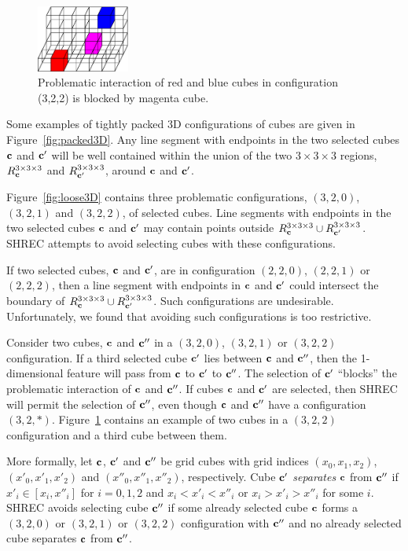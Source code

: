 \begin{figure}[t]
\centering

\includegraphics[width=1.2in]{images/config3D_3_2_2_B.eps}

\caption{Problematic interaction of red and blue cubes
in configuration (3,2,2) is blocked by magenta cube.}
\label{fig:blocked3D}
\end{figure}

Some examples of tightly packed 3D configurations of cubes are given
in Figure~\ref{fig:packed3D}.
Any line segment with endpoints in the two selected cubes $\mathbf{c}$ and $\mathbf{c}'$
will be well contained within the union 
of the two $3 \times 3 \times 3$ regions, 
$R^{3 \times 3 \times 3}_{\mathbf{c}}$ and $R^{3 \times 3 \times 3}_{\mathbf{c}'}$, around $\mathbf{c}$ and $\mathbf{c}'$.

Figure~\ref{fig:loose3D} contains three problematic configurations,
$(3,2,0)$, $(3,2,1)$ and $(3,2,2)$,
of  selected cubes.
Line segments with endpoints in the two selected cubes $\mathbf{c}$ and $\mathbf{c}'$
may contain points outside $R^{3 \times 3 \times 3}_{\mathbf{c}} \cup R^{3 \times 3 \times 3}_{\mathbf{c}'}$.
SHREC attempts to avoid selecting cubes with these configurations.

If two selected cubes, $\mathbf{c}$ and $\mathbf{c}'$, 
are in configuration $(2,2,0)$, $(2,2,1)$ or $(2,2,2)$,
then a line segment with endpoints in $\mathbf{c}$ and $\mathbf{c}'$
could intersect the boundary of $R^{3 \times 3 \times 3}_{\mathbf{c}} \cup R^{3 \times 3 \times 3}_{\mathbf{c}'}$.
Such configurations are undesirable.
Unfortunately, we found that avoiding such configurations is too restrictive.

Consider two cubes, $\mathbf{c}$ and $\mathbf{c}''$ 
in a $(3,2,0)$, $(3,2,1)$ or $(3,2,2)$ configuration.
If a third selected cube $\mathbf{c}'$ lies between $\mathbf{c}$ and $\mathbf{c}''$,
then the 1-dimensional feature will pass from $\mathbf{c}$ to $\mathbf{c}'$ to $\mathbf{c}''$.
The selection of $\mathbf{c}'$ ``blocks'' the problematic interaction 
of $\mathbf{c}$ and $\mathbf{c}''$.
If cubes $\mathbf{c}$ and $\mathbf{c}'$ are selected,
then SHREC will permit the selection of $\mathbf{c}''$,
even though $\mathbf{c}$ and $\mathbf{c}''$ have a configuration $(3,2,*)$.
Figure~\ref{fig:blocked3D} contains an example of two cubes 
in a $(3,2,2)$ configuration and a third cube between them.

More formally,
let $\mathbf{c}$, $\mathbf{c}'$ and $\mathbf{c}''$ be grid cubes with grid indices
$(x_0,x_1,x_2)$, $(x'_0,x'_1,x'_2)$ and $(x''_0,x''_1,x''_2)$, respectively.
Cube $\mathbf{c}'$ {\em separates} $\mathbf{c}$ from $\mathbf{c}''$
if $x'_i \in [x_i,x''_i]$ for $i = 0,1,2$
and $x_i < x'_i < x''_i$ or $x_i > x'_i > x''_i$ for some $i$.
SHREC avoids selecting cube $\mathbf{c}''$ if some already selected cube $\mathbf{c}$
forms a $(3,2,0)$ or $(3,2,1)$ or $(3,2,2)$ configuration with $\mathbf{c}''$
and no already selected cube separates $\mathbf{c}$ from $\mathbf{c}''$.

